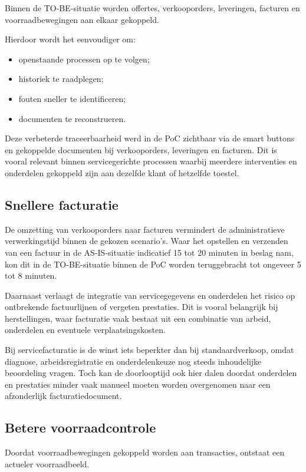 Binnen de TO-BE-situatie worden offertes, verkooporders, leveringen, facturen en voorraadbewegingen aan elkaar gekoppeld.

Hierdoor wordt het eenvoudiger om:
\begin{itemize}
    \item openstaande processen op te volgen;
    \item historiek te raadplegen;
    \item fouten sneller te identificeren;
    \item documenten te reconstrueren.
\end{itemize}

Deze verbeterde traceerbaarheid werd in de PoC zichtbaar via de smart buttons en gekoppelde documenten bij verkooporders, leveringen en facturen. Dit is vooral relevant binnen servicegerichte processen waarbij meerdere interventies en onderdelen gekoppeld zijn aan dezelfde klant of hetzelfde toestel.

\subsection{Snellere facturatie}

De omzetting van verkooporders naar facturen vermindert de administratieve verwerkingstijd binnen de gekozen scenario's. Waar het opstellen en verzenden van een factuur in de AS-IS-situatie indicatief 15 tot 20 minuten in beslag nam, kon dit in de TO-BE-situatie binnen de PoC worden teruggebracht tot ongeveer 5 tot 8 minuten.

Daarnaast verlaagt de integratie van servicegegevens en onderdelen het risico op ontbrekende factuurlijnen of vergeten prestaties. Dit is vooral belangrijk bij herstellingen, waar facturatie vaak bestaat uit een combinatie van arbeid, onderdelen en eventuele verplaatsingskosten.

Bij servicefacturatie is de winst iets beperkter dan bij standaardverkoop, omdat diagnose, arbeidsregistratie en onderdelenkeuze nog steeds inhoudelijke beoordeling vragen. Toch kan de doorlooptijd ook hier dalen doordat onderdelen en prestaties minder vaak manueel moeten worden overgenomen naar een afzonderlijk facturatiedocument.

\subsection{Betere voorraadcontrole}

Doordat voorraadbewegingen gekoppeld worden aan transacties, ontstaat een actueler voorraadbeeld.


